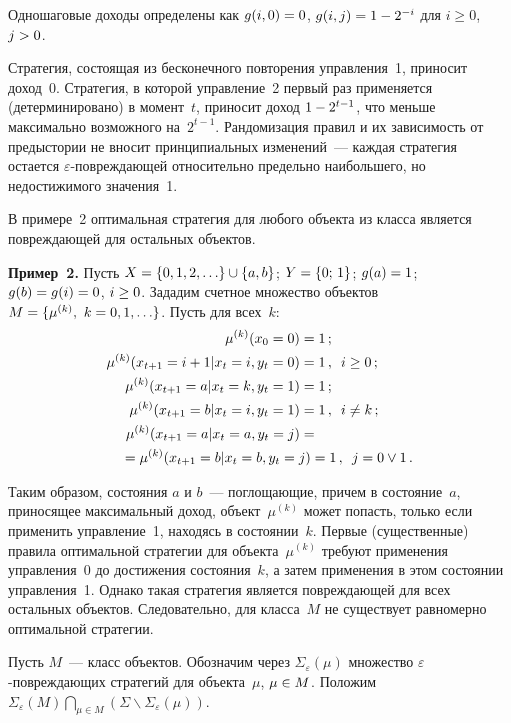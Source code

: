 \begin{multicols}{2}
  Одношаговые доходы определены как $g(i,0)\hm=0$, $g(i,j)\hm=1-2^{-i}$ для $i\geq 0$, 
$j\hm>0$.
  
  Стратегия, состоящая из бесконечного повторения управления~1, приносит доход~0. 
Стратегия, в которой управление~2 первый раз применяется (детерминировано) в 
момент~$t$, приносит доход $1\hm-2^{t-1}$, что меньше максимально возможного 
на~$2^{t-1}$. Рандомизация правил и их зависимость от предыстории не вносит 
принципиальных изменений~--- каждая стратегия остается 
  $\varepsilon$-по\-вреж\-да\-ющей относительно предельно наибольшего, но 
недостижимого значения~1.
  
  В примере~2 оптимальная стратегия для любого объекта из класса является 
повреждающей для остальных объектов.
  
  \medskip
  
  \noindent
  \textbf{Пример~2.} Пусть $X\hm= \{0, 1, 2, \ldots\}\cup \{a,b\}$; $Y\hm=\{0;\,1\}$; 
$g(a)\hm=1$; $g(b)\hm=g(i)\hm=0$, $i\hm\geq0$. Зададим счетное множество объектов 
$M\hm=\{\mu^{(k)},\ k\hm=0, 1, \ldots\}$. Пусть для всех~$k$:
  \begin{align*}
  \mu^{(k)}(x_0=0)&=1\,;\\
  \mu^{(k)}(x_{t+1}=i+1\vert x_t=i, y_t=0)&=1\,,\enskip i\geq0\,;\\
     \mu^{(k)}(x_{t+1}=a\vert x_t=k,y_t=1)&=1\,;\\
     \mu^{(k)}(x_{t+1}=b\vert x_t=i,y_t=1) &=1\,,\enskip i\not=k\,;\\
     \mu^{(k)}(x_{t+1}=a\vert x_t=a,y_t=j)&={}\\
&\hspace*{-45mm}{}=\mu^{(k)}(x_{t+1}=b\vert 
x_t=b,y_t=j)=1\,,\enskip j=0\vee 1\,.
     \end{align*}
  
  Таким образом, состояния $a$ и $b$~--- погло\-ща\-ющие, причем в состояние~$a$, 
приносящее максимальный доход, объект~$\mu^{(k)}$ может попасть, только если 
применить управление~1, находясь в со\-сто\-янии~$k$. Первые (существенные) правила 
оптимальной стратегии для объекта~$\mu^{(k)}$ требуют применения управления~0 до 
достижения состояния~$k$, а затем применения в этом состоянии управления~1. Однако 
такая стратегия является повреждающей для всех остальных объектов. Следовательно, для 
класса~$M$ не существует равномерно оптимальной стра\-тегии.
{

}
  
  Пусть $M$~--- класс объектов. Обозначим через $\Sigma_\varepsilon(\mu)$ множество 
$\varepsilon$-по\-вреж\-да\-ющих стратегий для объекта~$\mu$, $\mu\hm\in M$. Положим 
$\Sigma_\varepsilon(M)\bigcap\limits_{\mu\in M}\left( \Sigma\backslash 
\Sigma_\varepsilon(\mu)\right)$.
  

\end{multicols}
